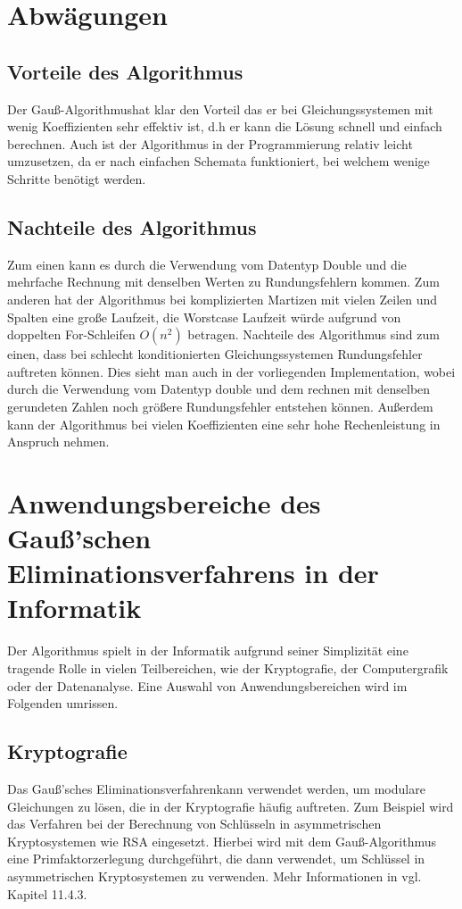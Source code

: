 \documentclass[a4paper, 12pt]{report}
\newcommand{\GE}{Gauß'sches Eliminationsverfahren}
\newcommand{\GA}{Gauß-Algorithmus}
\begin{document}
{\let\clearpage\relax \chapter{Abwägungen}}
\section{Vorteile des Algorithmus}
Der \GA hat klar den Vorteil das er bei Gleichungssystemen mit wenig Koeffizienten
sehr effektiv ist, d.h er kann die Lösung schnell und einfach berechnen.
Auch ist der Algorithmus in der Programmierung relativ leicht umzusetzen,
da er nach einfachen Schemata funktioniert, bei welchem wenige Schritte benötigt werden.
\section{Nachteile des Algorithmus}
Zum einen kann es durch die Verwendung vom Datentyp Double und die mehrfache Rechnung mit denselben Werten zu Rundungsfehlern kommen.
Zum anderen hat der Algorithmus bei komplizierten Martizen mit vielen Zeilen und Spalten eine große Laufzeit,
die Worstcase Laufzeit würde aufgrund von doppelten For-Schleifen $ O(n^2) $ betragen.
Nachteile des Algorithmus sind zum einen, dass bei schlecht konditionierten Gleichungssystemen Rundungsfehler auftreten können.
Dies sieht man auch in der vorliegenden Implementation, wobei durch die Verwendung vom Datentyp double
und dem rechnen mit denselben gerundeten Zahlen noch größere Rundungsfehler entstehen können.
Außerdem kann der Algorithmus bei vielen Koeffizienten eine
sehr hohe Rechenleistung in Anspruch nehmen.

{\let\clearpage\relax \chapter{Anwendungsbereiche des Gauß'schen \\ Eliminationsverfahrens in der Informatik}}
Der Algorithmus spielt in der Informatik aufgrund seiner Simplizität eine tragende Rolle in vielen Teilbereichen,
wie der Kryptografie, der Computergrafik oder der Datenanalyse.
Eine Auswahl von Anwendungsbereichen wird im Folgenden umrissen.
\section{Kryptografie}
Das \GE kann verwendet werden, um modulare Gleichungen zu lösen,
die in der Kryptografie häufig auftreten.
Zum Beispiel wird das Verfahren bei der Berechnung von Schlüsseln in asymmetrischen Kryptosystemen wie RSA eingesetzt.
Hierbei wird mit dem Gauß-Algorithmus eine Primfaktorzerlegung durchgeführt, die dann
verwendet, um Schlüssel in asymmetrischen Kryptosystemen zu verwenden. Mehr Informationen in \cite{3} vgl. Kapitel 11.4.3.
\end{document}

